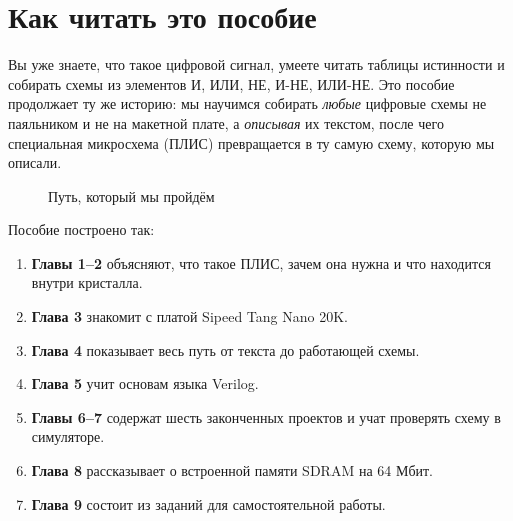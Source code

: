 \chapter*{Как читать это пособие}

Вы уже знаете, что такое цифровой сигнал, умеете читать таблицы истинности
и собирать схемы из элементов И, ИЛИ, НЕ, И-НЕ, ИЛИ-НЕ. Это пособие
продолжает ту же историю: мы научимся собирать \emph{любые} цифровые
схемы не паяльником и не на макетной плате, а \emph{описывая} их текстом, после чего
специальная микросхема (ПЛИС) превращается в ту самую схему, которую
мы описали.

\begin{figure}[H]
\centering
{}
\caption{Путь, который мы пройдём}
\end{figure}

Пособие построено так:
\begin{enumerate}
  \item \textbf{Главы 1--2} объясняют, что такое ПЛИС, зачем она нужна и что
        находится внутри кристалла.
  \item \textbf{Глава 3} знакомит с платой Sipeed Tang Nano 20K.
  \item \textbf{Глава 4} показывает весь путь от текста до работающей схемы.
  \item \textbf{Глава 5} учит основам языка Verilog.
  \item \textbf{Главы 6--7} содержат шесть законченных проектов и учат
        проверять схему в симуляторе.
  \item \textbf{Глава 8} рассказывает о встроенной памяти SDRAM на 64 Мбит.
  \item \textbf{Глава 9} состоит из заданий для самостоятельной работы.
\end{enumerate}


